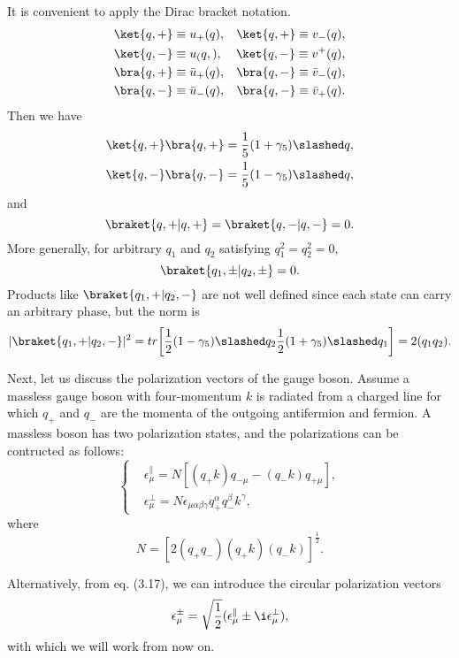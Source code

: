 It is convenient to apply the Dirac bracket notation.
\begin{eqnarray}
&\ket{q,+}\equiv u_+(q),&\ket{q,+}\equiv v_-(q),\nonumber\\
&\ket{q,-}\equiv u_(q,),&\ket{q,-}\equiv v^+(q),\nonumber\\
&\bra{q,+}\equiv \bar{u}_+(q),&\bra{q,-}\equiv \bar{v}_-(q),\nonumber\\
&\bra{q,-}\equiv \bar{u}_-(q),&\bra{q,-}\equiv \bar{v}_+(q).
\end{eqnarray}
Then we have 
\begin{eqnarray}
\ket{q,+}\bra{q,+}=\frac{1}{5}(1+\gamma_5)\slashed q,\nonumber\\
\ket{q,-}\bra{q,-}=\frac{1}{5}(1-\gamma_5)\slashed q,
\end{eqnarray}
and
\begin{equation}
\braket{q,+|q,+}=\braket{q,-|q,-}=0.
\end{equation}
More generally, for arbitrary $q_1$ and $q_2$ satisfying $q_1^2=q_2^2=0$,
\begin{equation}
\braket{q_1,\pm|q_2,\pm}=0.
\end{equation}
Products like $\braket{q_1,+|q_2,-}$ are not well defined since each state can carry an arbitrary phase, but the norm is 
\begin{equation}
|\braket{q_1,+|q_2,-}|^2=tr\biggl[\frac{1}{2}(1-\gamma_5)\slashed q_2\frac{1}{2}(1+\gamma_5)\slashed q_1\biggr]=2(q_1q_2).
\end{equation}

Next, let us discuss the polarization vectors of the gauge boson. Assume a massless gauge boson with four-momentum $k$ is radiated from a charged line for which $q_+$ and $q_-$ are the momenta of the outgoing antifermion and fermion. A massless boson has two polarization states, and the polarizations can be contructed as follows:
\begin{equation}
\begin{cases}
&\epsilon^\parallel_\mu=N[(q_+k)q_{-\mu}-(q_-k)q_{+\mu}],\\
&\epsilon^\perp_\mu=N\epsilon_{\mu\alpha\beta\gamma}q^\alpha_+q^\beta_-k^\gamma,
\end{cases}
\end{equation}
where
\begin{equation}
N=[2(q_+q_-)(q_+k)(q_-k)]^\frac{1}{2}.
\end{equation}

Alternatively, from eq. (3.17), we can introduce the circular polarization vectors
\begin{equation}
\epsilon^\pm_\mu=\sqrt{\frac{1}{2}}(\epsilon^\parallel_\mu\pm\i\epsilon^\perp_\mu),
\end{equation}
with which we will work from now on. 

